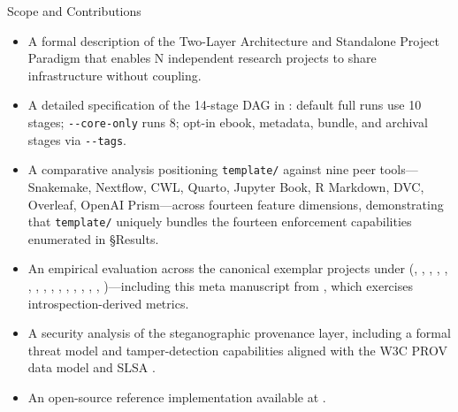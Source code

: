 \documentclass[
  ignorenonframetext,
]{beamer}
\providecommand{\tightlist}{%
  \setlength{\itemsep}{0pt}\setlength{\parskip}{0pt}}
\begin{document}
\begin{frame}{Scope and Contributions}
\begin{itemize}
\tightlist
\item
  A formal description of the Two-Layer Architecture and Standalone
  Project Paradigm that enables N independent research projects to share
  infrastructure without coupling.
\item
  A detailed specification of the 14-stage DAG in
  : default full runs
  use 10 stages; \texttt{-\/-core-only} runs 8; opt-in ebook, metadata,
  bundle, and archival stages via \texttt{-\/-tags}.
\item
  A comparative analysis positioning \texttt{template/} against nine
  peer tools---Snakemake, Nextflow, CWL, Quarto, Jupyter Book, R
  Markdown, DVC, Overleaf, OpenAI Prism---across fourteen feature
  dimensions, demonstrating that \texttt{template/} uniquely bundles the
  fourteen enforcement capabilities enumerated in §Results.
\item
  An empirical evaluation across the canonical exemplar projects under
  (,
  ,
  ,
  ,
  ,
  ,
  ,
  ,
  ,
  ,
  ,
  ,
  ,
  ,
  ,
  )---including this meta
  manuscript from , which
  exercises introspection-derived metrics.
\item
  A security analysis of the steganographic provenance layer, including
  a formal threat model and tamper-detection capabilities aligned with
  the W3C PROV data model  and SLSA
  .
\item
  An open-source reference implementation available at
  .
\end{itemize}
\end{frame}
\end{document}
